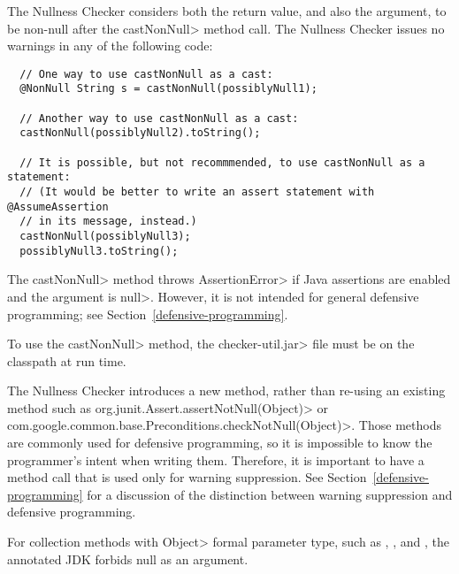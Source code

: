 The Nullness Checker considers both the return value, and also the
argument, to be non-null after the \<castNonNull> method call.
The Nullness Checker issues no warnings in any of the following
code:

\begin{Verbatim}
  // One way to use castNonNull as a cast:
  @NonNull String s = castNonNull(possiblyNull1);

  // Another way to use castNonNull as a cast:
  castNonNull(possiblyNull2).toString();

  // It is possible, but not recommmended, to use castNonNull as a statement:
  // (It would be better to write an assert statement with @AssumeAssertion
  // in its message, instead.)
  castNonNull(possiblyNull3);
  possiblyNull3.toString();
\end{Verbatim}

  The \<castNonNull> method throws \<AssertionError> if Java assertions are enabled and
  the argument is \<null>.  However, it is not intended for general defensive
  programming; see Section~\ref{defensive-programming}.

  To use the \<castNonNull> method, the \<checker-util.jar> file
  must be on the classpath at run time.

\begin{sloppypar}
The Nullness Checker introduces a new method, rather than re-using an
existing method such as \<org.junit.Assert.assertNotNull(Object)> or
\<com.google.common.base.Preconditions.checkNotNull(Object)>.  Those
methods are commonly used for defensive programming, so it is impossible to
know the programmer's intent when writing them.  Therefore, it is important to
have a method call that is used only for warning suppression.  See
Section~\ref{defensive-programming} for a discussion of
the distinction between warning suppression and defensive programming.
\end{sloppypar}



For collection methods with \<Object> formal parameter type, such as
,
, and
,
the annotated JDK forbids null as an argument.


